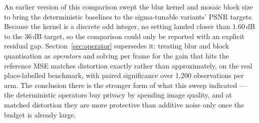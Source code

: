 \documentclass[10pt,journal]{IEEEtran}
\begin{document}
An earlier version of this comparison swept the blur kernel and mosaic block
size to bring the deterministic baselines to the sigma-tunable variants' PSNR
targets. Because the kernel is a discrete odd integer, no setting landed
closer than $1.60$\,dB to the 36\,dB target, so the comparison could only be
reported with an explicit residual gap. Section~\ref{sec:operator} supersedes
it: treating blur and block quantisation as \emph{operators} and solving per
frame for the gain that hits the reference MSE matches distortion exactly
rather than approximately, on the real place-labelled benchmark, with paired
significance over 1,200 observations per arm. The conclusion there is the
stronger form of what this sweep indicated --- the deterministic operators buy
privacy by spending image quality, and at matched distortion they are more
protective than additive noise only once the budget is already large.




\end{document}
